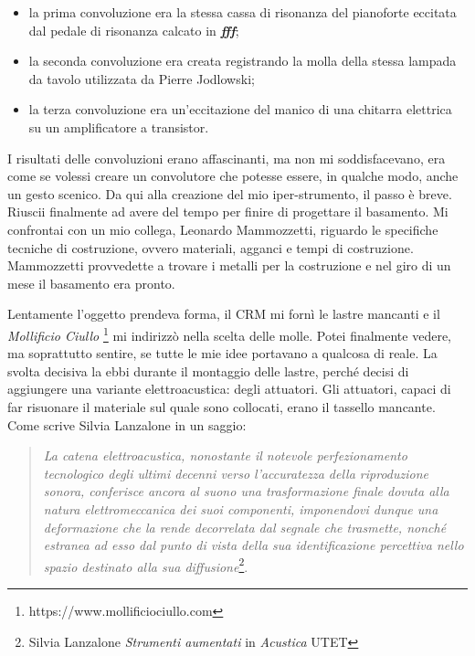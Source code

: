 \begin{itemize}
\item{la prima convoluzione era la stessa cassa di risonanza del pianoforte eccitata dal pedale di risonanza calcato in \textit{\textbf{fff}};}
\item{la seconda convoluzione era creata registrando la molla della stessa lampada da tavolo utilizzata da Pierre Jodlowski;}
\item{la terza convoluzione era un'eccitazione del manico di una chitarra elettrica su un amplificatore a transistor.}
\end{itemize}

%

I risultati delle convoluzioni erano affascinanti, ma non mi soddisfacevano,  era come se volessi creare un convolutore che potesse essere, in qualche modo, anche un gesto scenico. Da qui alla creazione del mio iper-strumento, il passo è breve. Riuscii finalmente ad avere del tempo per finire di progettare il basamento. Mi confrontai con un mio collega, Leonardo Mammozzetti, riguardo le specifiche tecniche di costruzione, ovvero materiali, agganci e tempi di costruzione. Mammozzetti provvedette a trovare i metalli per la costruzione e nel giro di un mese il basamento era pronto.

Lentamente l'oggetto prendeva forma, il CRM mi fornì le lastre mancanti e il \textit{Mollificio Ciullo} \footnote{https://www.mollificiociullo.com} mi indirizzò nella scelta delle molle. Potei finalmente vedere, ma soprattutto sentire, se tutte le mie idee portavano a qualcosa di reale. La svolta decisiva la ebbi durante il montaggio delle lastre, perché decisi di aggiungere una variante elettroacustica: degli attuatori. Gli attuatori, capaci di far risuonare il materiale sul quale sono collocati, erano il tassello mancante. Come scrive Silvia Lanzalone in un saggio:

\begin{quotation}
\textit{La catena elettroacustica, nonostante il notevole perfezionamento tecnologico degli ultimi decenni verso l'accuratezza della riproduzione sonora, conferisce ancora al suono una trasformazione finale dovuta alla natura elettromeccanica dei suoi componenti, imponendovi dunque una deformazione che la rende decorrelata dal segnale che trasmette, nonché estranea ad esso dal punto di vista della sua identificazione percettiva nello spazio destinato alla sua diffusione}\footnote{Silvia Lanzalone \textit{Strumenti aumentati} in \textit{Acustica} UTET}.
\end{quotation}

